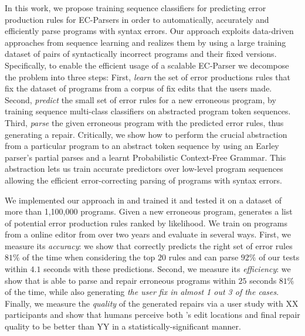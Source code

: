 In this work, we propose training sequence classifiers for predicting error
production rules for EC-Parsers in order to automatically, accurately and
efficiently parse programs with syntax errors. Our approach exploits data-driven
approaches from sequence learning and realizes them by using a large training
dataset of pairs of syntactically incorrect programs and their fixed versions.
%
Specifically, to enable the efficient usage of a scalable EC-Parser we decompose
the problem into three steps:
%
First, \emph{learn} the set of error productions rules that fix the dataset of
programs from a corpus of fix edits that the users made.
%
Second, \emph{predict} the small set of error rules for a new erroneous program,
by training sequence multi-class classifiers on abstracted program token
sequences.
%
Third, \emph{parse} the given erroneous program with the predicted error rules,
thus generating a repair.
%
Critically, we show how to perform the crucial abstraction from a particular
program to an abstract token sequence by using an Earley parser's
\citep{Earley_1970} partial parses and a learnt Probabilistic Context-Free
Grammar. This abstraction lets us train accurate predictors over low-level
program sequences allowing the efficient error-correcting parsing of programs
with syntax errors.

\mypara{\toolname}
We implemented our approach in \toolname and trained it and tested it on a
dataset of more than 1,100,000 programs. Given a new erroneous program,
\toolname generates a list of potential error production rules ranked by
likelihood. We train \toolname on programs from a online editor from over two
years and evaluate in several ways.
%
First, we measure its \emph{accuracy}: we show that \toolname correctly predicts
the right set of error rules $81\%$ of the time when considering the top $20$
rules and can parse $92\%$ of our tests within $4.1$ seconds with these
predictions.
%
Second, we measure its \emph{efficiency}: we show that \toolname is able to
parse and repair erroneous programs within $25$ seconds $81\%$ of the time,
while also generating \emph{the user fix in almost 1 out 3 of the cases}.
%
Finally, we measure the \emph{quality} of the generated repairs via a user study
with XX participants and show that humans perceive both \toolname's edit
locations and final repair quality to be better than YY in a
statistically-significant manner.
